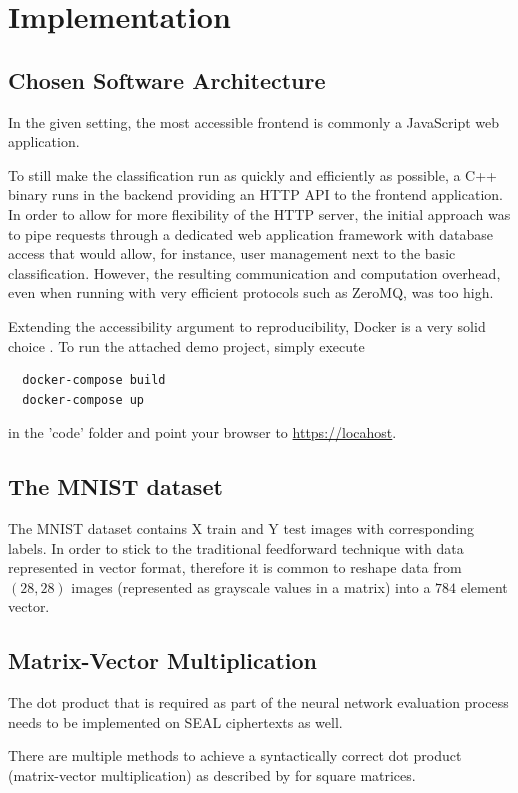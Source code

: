 \chapter{Implementation}
\label{chap:implementation}

\section{Chosen Software Architecture}
In the given setting, the most accessible frontend is commonly a JavaScript web application.

To still make the classification run as quickly and efficiently as possible, a C++ binary runs
in the backend providing an HTTP API to the frontend application.
In order to allow for more flexibility of the HTTP server, the initial approach was to
pipe requests through a dedicated web application framework with database access
that would allow, for instance, user management next to the basic classification.
However, the resulting communication and computation overhead, even when running with very
efficient protocols such as ZeroMQ, was too high.

Extending the accessibility argument to reproducibility, Docker is a very solid choice \parencite{using-docker-in-science}.
To run the attached demo project, simply execute
\begin{verbatim}
  docker-compose build
  docker-compose up
\end{verbatim}
in the 'code' folder and point your browser to \url{https://locahost}.

\section{The MNIST dataset}
The MNIST dataset \parencite{mnist-original} contains X train and Y test images with corresponding labels.
In order to stick to the traditional feedforward technique with data represented
in vector format, therefore it is common to reshape data from $(28, 28)$ images (represented as grayscale values in a matrix)
into a $784$ element vector.

\section{Matrix-Vector Multiplication}
The dot product that is required as part of the neural network evaluation process
needs to be implemented on SEAL ciphertexts as well.

There are multiple methods to achieve a syntactically correct dot product (matrix-vector multiplication)
as described by \textcite{2018-gazelle} for square matrices.

